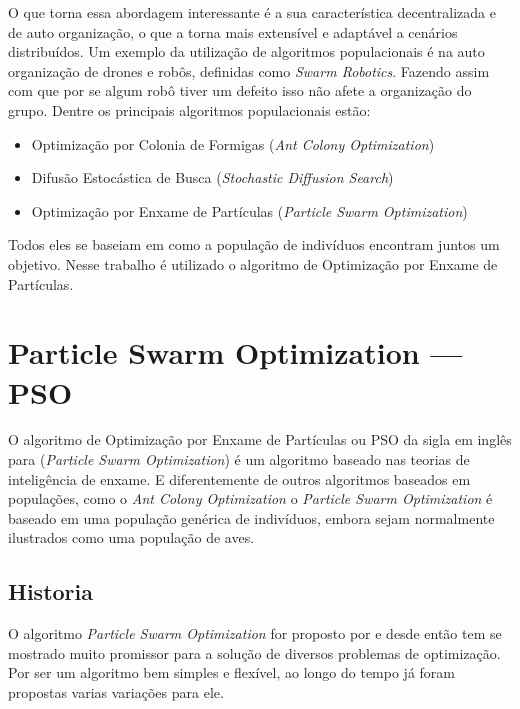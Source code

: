         O que torna essa abordagem interessante é a sua característica decentralizada e de auto organização, o que a torna mais extensível e adaptável a cenários distribuídos. Um exemplo da utilização de algoritmos populacionais é na auto organização de drones e robôs, definidas como \textit{Swarm Robotics}. Fazendo assim com que por se algum robô tiver um defeito isso não afete a organização do grupo. \newline
        Dentre os principais algoritmos populacionais estão:
        \begin{itemize}
            \item Optimização por Colonia de Formigas (\textit{Ant Colony Optimization}) 
            \item Difusão Estocástica de Busca (\textit{Stochastic Diffusion Search})
            \item Optimização por Enxame de Partículas (\textit{Particle Swarm Optimization})
        \end{itemize}
        
        Todos eles se baseiam em como a população de indivíduos encontram juntos um objetivo. Nesse trabalho é utilizado o algoritmo de Optimização por Enxame de Partículas. 


\section{Particle Swarm Optimization — PSO}
        O algoritmo de Optimização por Enxame de Partículas ou PSO da sigla em inglês para (\textit{Particle Swarm Optimization}) é um algoritmo baseado nas teorias de inteligência de enxame. E diferentemente de outros algoritmos baseados em populações, como o \textit{Ant Colony Optimization} o \textit{Particle Swarm Optimization} é baseado em uma população genérica de indivíduos, embora sejam normalmente ilustrados como uma população de aves.


    \subsection{Historia}
        O algoritmo \textit{Particle Swarm Optimization} for proposto por \cite{Kennedy1995} e desde então tem se mostrado muito promissor para a solução de diversos problemas de optimização. Por ser um algoritmo bem simples e flexível, ao longo do tempo já foram propostas varias variações para ele. \newline
        
